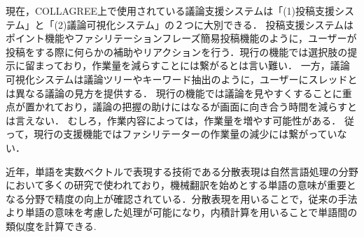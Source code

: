 現在，COLLAGREE上で使用されている議論支援システムは「(1)投稿支援システム」と「(2)議論可視化システム」の２つに大別できる．
投稿支援システムはポイント機能やファシリテーションフレーズ簡易投稿機能のように，ユーザーが投稿をする際に何らかの補助やリアクションを行う．現行の機能では選択肢の提示に留まっており，作業量を減らすことには繋がるとは言い難い．
一方，議論可視化システムは議論ツリーやキーワード抽出のように，ユーザーにスレッドとは異なる議論の見方を提供する．
現行の機能では議論を見やすくすることに重点が置かれており，議論の把握の助けにはなるが画面に向き合う時間を減らすとは言えない．
むしろ，作業内容によっては，作業量を増やす可能性がある．
従って，現行の支援機能ではファシリテーターの作業量の減少には繋がっていない．

近年，単語を実数ベクトルで表現する技術である分散表現は自然言語処理の分野において多くの研究で使われており，機械翻訳を始めとする単語の意味が重要となる分野で精度の向上が確認されている．分散表現を用いることで，従来の手法より単語の意味を考慮した処理が可能になり，内積計算を用いることで単語間の類似度を計算できる.
